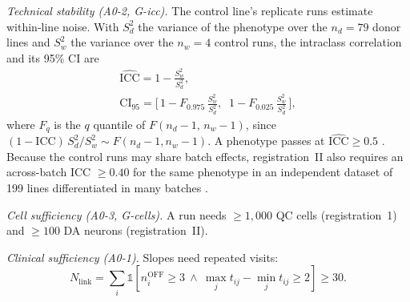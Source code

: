 \emph{Technical stability (A0-2, G-icc).} The control line's replicate runs estimate within-line
noise. With $S_d^2$ the variance of the phenotype over the $n_d = 79$ donor lines and $S_w^2$ the
variance over the $n_w = 4$ control runs, the intraclass correlation and its 95\% CI are
\begin{gather}
\widehat{\mathrm{ICC}} = 1 - \frac{S_w^2}{S_d^2},
\label{eq:icc}\\
\mathrm{CI}_{95} = \Big[\,1 - F_{0.975}\,\tfrac{S_w^2}{S_d^2},\;\; 1 - F_{0.025}\,\tfrac{S_w^2}{S_d^2}\,\Big],
\label{eq:icc_ci}
\end{gather}
where $F_q$ is the $q$ quantile of $F(n_d - 1,\, n_w - 1)$, since
$(1-\mathrm{ICC})\,S_d^2/S_w^2 \sim F(n_d-1, n_w-1)$. A phenotype passes at
$\widehat{\mathrm{ICC}} \ge 0.5$ \cite{koo2016guideline}. Because the control runs may share
batch effects, registration~II also requires an across-batch ICC $\ge 0.40$ for the same phenotype
in an independent dataset of 199 lines differentiated in many batches \cite{jerber2021population}.

\emph{Cell sufficiency (A0-3, G-cells).} A run needs $\ge 1{,}000$ QC cells (registration~1) and
$\ge 100$ DA neurons (registration~II).

\emph{Clinical sufficiency (A0-1).} Slopes need repeated visits:
\begin{equation}
N_{\mathrm{link}} = \sum_i \mathbb{1}\!\left[n_i^{\mathrm{OFF}} \ge 3\ \wedge\
\max_j t_{ij} - \min_j t_{ij} \ge 2\right] \ge 30.
\label{eq:a01}
\end{equation}

